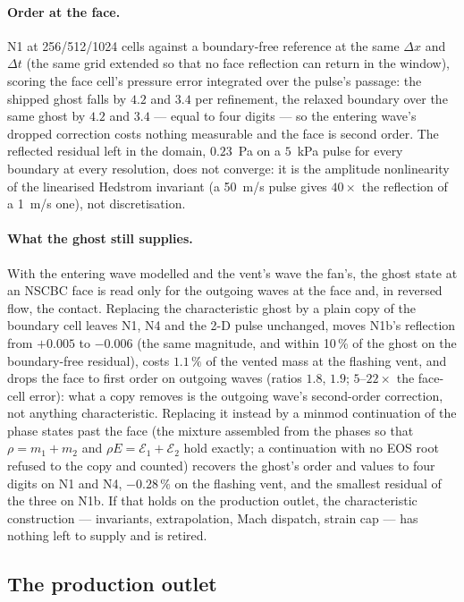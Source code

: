 \documentclass[11pt,a4paper]{article}
\begin{document}
\paragraph{Order at the face.}  N1 at 256/512/1024 cells against a
boundary-free reference at the same $\Delta x$ and $\Delta t$ (the same
grid extended so that no face reflection can return in the window),
scoring the face cell's pressure error integrated over the pulse's
passage: the shipped ghost falls by $4.2$ and $3.4$ per refinement, the
relaxed boundary over the same ghost by $4.2$ and $3.4$ --- equal to
four digits --- so the entering wave's dropped correction costs nothing
measurable and the face is second order.  The reflected residual left
in the domain, $0.23$~Pa on a $5$~kPa pulse for every boundary at every
resolution, does not converge: it is the amplitude nonlinearity of the
linearised Hedstrom invariant (a 50~m/s pulse gives $40\times$ the
reflection of a 1~m/s one), not discretisation.

\paragraph{What the ghost still supplies.}  With the entering wave
modelled and the vent's wave the fan's, the ghost state at an NSCBC
face is read only for the outgoing waves at the face and, in reversed
flow, the contact.  Replacing the characteristic ghost by a plain copy
of the boundary cell leaves N1, N4 and the 2-D pulse unchanged, moves
N1b's reflection from $+0.005$ to $-0.006$ (the same magnitude, and
within 10\,\% of the ghost on the boundary-free residual), costs
$1.1\,\%$ of the vented mass at the flashing vent, and drops the face to
first order on outgoing waves (ratios $1.8$, $1.9$; $5$--$22\times$ the
face-cell error): what a copy removes is the outgoing wave's
second-order correction, not anything characteristic.  Replacing it
instead by a minmod continuation of the phase states past the face
(the mixture assembled from the phases so that $\rho = m_1 + m_2$ and
$\rho E = \mathcal{E}_1 + \mathcal{E}_2$ hold exactly; a continuation
with no EOS root refused to the copy and counted) recovers the ghost's
order and values to four digits on N1 and N4, $-0.28\,\%$ on the
flashing vent, and the smallest residual of the three on N1b.  If that
holds on the production outlet, the characteristic construction ---
invariants, extrapolation, Mach dispatch, strain cap --- has nothing
left to supply and is retired.

\subsection{The production outlet}
\label{sec:demo3}
\end{document}
